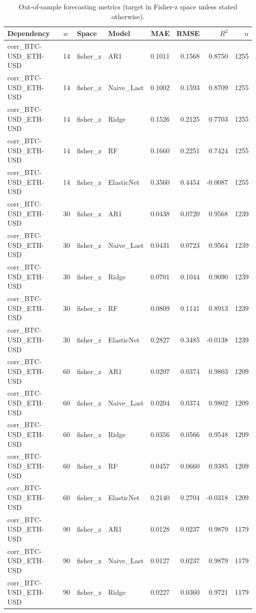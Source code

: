 \begin{table}[H]
\centering
\small
\caption{Out-of-sample forecasting metrics (target in Fisher-z space unless stated otherwise).}
\label{tab:metrics}
\begin{tabular}{lllp{2.8cm}rrrr}
\toprule
Dependency & $w$ & Space & Model & MAE & RMSE & $R^2$ & $n$ \\
\midrule
corr_BTC-USD_ETH-USD & 14 & fisher_z & AR1 & 0.1011 & 0.1568 & 0.8750 & 1255 \\
corr_BTC-USD_ETH-USD & 14 & fisher_z & Naive_Last & 0.1002 & 0.1593 & 0.8709 & 1255 \\
corr_BTC-USD_ETH-USD & 14 & fisher_z & Ridge & 0.1526 & 0.2125 & 0.7703 & 1255 \\
corr_BTC-USD_ETH-USD & 14 & fisher_z & RF & 0.1660 & 0.2251 & 0.7424 & 1255 \\
corr_BTC-USD_ETH-USD & 14 & fisher_z & ElasticNet & 0.3560 & 0.4454 & -0.0087 & 1255 \\
corr_BTC-USD_ETH-USD & 30 & fisher_z & AR1 & 0.0438 & 0.0720 & 0.9568 & 1239 \\
corr_BTC-USD_ETH-USD & 30 & fisher_z & Naive_Last & 0.0431 & 0.0723 & 0.9564 & 1239 \\
corr_BTC-USD_ETH-USD & 30 & fisher_z & Ridge & 0.0701 & 0.1044 & 0.9090 & 1239 \\
corr_BTC-USD_ETH-USD & 30 & fisher_z & RF & 0.0809 & 0.1141 & 0.8913 & 1239 \\
corr_BTC-USD_ETH-USD & 30 & fisher_z & ElasticNet & 0.2827 & 0.3485 & -0.0138 & 1239 \\
corr_BTC-USD_ETH-USD & 60 & fisher_z & AR1 & 0.0207 & 0.0374 & 0.9803 & 1209 \\
corr_BTC-USD_ETH-USD & 60 & fisher_z & Naive_Last & 0.0204 & 0.0374 & 0.9802 & 1209 \\
corr_BTC-USD_ETH-USD & 60 & fisher_z & Ridge & 0.0356 & 0.0566 & 0.9548 & 1209 \\
corr_BTC-USD_ETH-USD & 60 & fisher_z & RF & 0.0457 & 0.0660 & 0.9385 & 1209 \\
corr_BTC-USD_ETH-USD & 60 & fisher_z & ElasticNet & 0.2140 & 0.2704 & -0.0318 & 1209 \\
corr_BTC-USD_ETH-USD & 90 & fisher_z & AR1 & 0.0128 & 0.0237 & 0.9879 & 1179 \\
corr_BTC-USD_ETH-USD & 90 & fisher_z & Naive_Last & 0.0127 & 0.0237 & 0.9879 & 1179 \\
corr_BTC-USD_ETH-USD & 90 & fisher_z & Ridge & 0.0227 & 0.0360 & 0.9721 & 1179 \\

\end{tabular}
\end{table}

